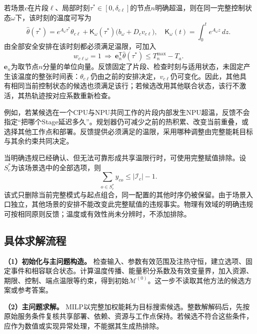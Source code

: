 若场景\(c\)在片段\(\ell\)、局部时刻\(\tau^*\in[0,\delta_{c\ell}]\)的节点\(n\)明确超温，则在同一完整控制状态\(\omega\)下，该时刻的温度可写为
\begin{equation}
\widehat\theta(\tau^*)=
e^{A_\omega\tau^*}\theta_{c\ell}
+\mathsf K_\omega(\tau^*)\bigl(b_\omega+D_cv_{c\ell}\bigr),
\quad \mathsf K_\omega(t)=\int_0^t e^{A_\omega z}\,dz.
\label{eq:interior-temperature}
\end{equation}
由全部安全安排在该时刻都必须满足温限，可加入
\begin{equation}
w_{c\ell\omega}=1\ \Longrightarrow\
\mathbf e_n^{\mathsf T}\widehat\theta(\tau^*)
\le T_n^{\max}-T_a.
\label{eq:conditional-cut}
\end{equation}
\(\mathbf e_n\)为取节点\(n\)分量的单位向量。反馈固定了片段、检查时刻与适用状态，未固定产生该温度的整张时间表：\(\theta_{c\ell}\)仍由之前的安排决定，\(v_{c\ell}\)仍可变化。因此，其他具有相同当前控制状态的候选也须满足该行；若候选改用其他联合状态，该行不激活，其热轨迹按对应系数重新检查。

例如，若某候选在一个CPU与NPU共同工作的片段内部发生NPU超温，反馈不会指定“把哪个Stage延迟多久”。规划器仍可减少之前的热积累、改变当前重叠，或选择其他工作点和部署。反馈提供必须满足的温限，采用哪种调整由完整能耗目标与其余约束共同决定。

当明确违规已经确认、但无法可靠形成共享温限行时，可使用完整赋值排除。设\(S_c^*\)为该场景选中的全部选项，则
\begin{equation}
\sum_{o\in S_c^*}y_{co}\le |\mathcal I_c|-1.
\label{eq:full-assignment-cut}
\end{equation}
该式只删除当前完整模式与起点组合，同一配置的其他时序仍被保留。由于场景入口独立，其他场景的安排不能改变此完整赋值的违规事实。物理有效域的明确违规可按相同原则反馈；温度或有效性尚未分辨时，不添加排除。

\subsection{具体求解流程}

\textbf{（1）初始化与主问题构造。} 检查输入、参数有效范围及注热守恒，建立选项、固定事件和相容联合状态。计算温度传播、能量积分系数及有效变量界，加入资源、期限、控制、端点温限等约束，得到初始\(\mathcal M^{(0)}\)。这一步不读取其他方法的候选方案或参考答案。

\textbf{（2）主问题求解。} MILP以完整加权能耗为目标搜索候选。整数解解码后，先按原始服务条件复核共享部署、依赖、资源与工作点保持。若候选不符合这些条件，应作为数值或实现异常处理，不能据其生成热排除。

